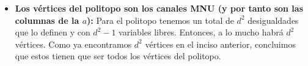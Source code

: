 \begin{itemize}
\item \textbf{Los vértices del politopo son los canales MNU (y por tanto son las columnas de la $a$):} 
Para el politopo tenemos un total de $d^2$ desigualdades que lo definen y con $d^2 - 1$ variables libres. Entonces, a lo mucho habrá $d^2$ vértices. Como ya encontramos $d^2$ vértices en el inciso anterior, concluimos que estos tienen que ser todos los vértices del politopo.
\end{itemize}